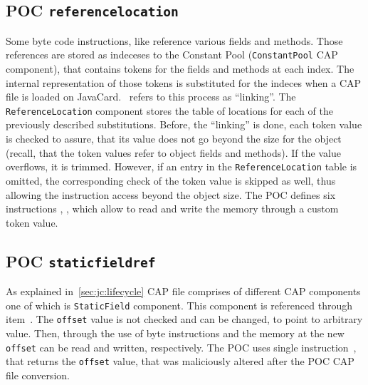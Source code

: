 \subsection{POC \texttt{referencelocation}}
Some byte code instructions, like \getfield reference various fields and methods. Those references are stored as indeceses to the Constant Pool (\texttt{ConstantPool} CAP component), that contains tokens for the fields and methods at each index. The internal representation of those tokens is substituted for the indeces when a CAP file is loaded on JavaCard.~\cite{se:oracle:part1} refers to this process as ``linking''. The \texttt{ReferenceLocation} component stores the table of locations for each of the previously described substitutions.
Before, the ``linking'' is done, each token value is checked to assure, that its value does not go beyond the size for the object (recall, that the token values refer to object fields and methods). If the value overflows, it is trimmed. However, if an entry in the \texttt{ReferenceLocation} table is omitted, the corresponding check of the token value is skipped as well, thus allowing the \getfield instruction access beyond the object size.
The POC defines six instructions \getfieldins, \putfieldins\footnotemark, which allow to read and write the memory through a custom token value. 

\subsection{POC \texttt{staticfieldref}}
As explained in~\ref{sec:jc:lifecycle} CAP file comprises of different CAP components one of which is \texttt{StaticField} component. This component is referenced through \constantstaticfieldref item~\cite{jcspecs31download}. The \texttt{offset} value is not checked and can be changed, to point to arbitrary value. Then, through the use of byte instructions \getstatic\footnotemark and \putstatic the memory at the new \texttt{offset} can be read and written, respectively. The POC uses single instruction~\getstaticins, that returns the \texttt{offset} value, that was maliciously altered after the POC CAP file conversion.

